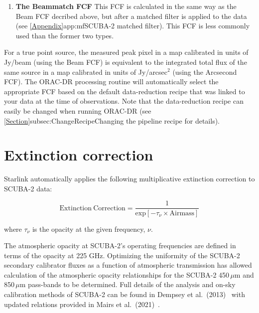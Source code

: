 \begin{enumerate}
\begin{enumerate}
   \vspace{3mm}

  \item\textbf{The Beammatch FCF}
    This FCF is calculated in the same way as the Beam FCF decribed
    above, but after a matched filter is applied to the data (see
    \cref{Appendix}{app:mf}{SCUBA-2 matched filter}).
    This FCF is less commonly used than the former two types.

  \end{enumerate}

\end{enumerate}

For a true point source, the measured peak pixel in a map calibrated in units of Jy/beam 
(using the Beam FCF) is equivalent to the integrated total flux of the same source in a map 
calibrated in units of Jy/arcsec$^{2}$ (using the Arcsecond FCF). The ORAC-DR processing
routine will automatically select the appropriate FCF based on the default data-reduction recipe
that was linked to your data at the time of observations. Note that the data-reduction recipe can 
easily be changed when running ORAC-DR (see
\cref{Section}{subsec:ChangeRecipe}{Changing the pipeline recipe} for details).

\section{Extinction correction}

Starlink automatically applies the following multiplicative extinction correction to SCUBA-2 data:

\begin{equation}
\label{eq:extcor}
\mathrm{Extinction\:Correction} = \frac{1}{\mathrm{exp}[-\tau_{\nu}\times\mathrm{Airmass}]}
\end{equation}

where $\tau_{\nu}$ is the opacity at the given frequency, $\nu$.

The atmospheric opacity at SCUBA-2’s operating frequencies are defined in 
terms of the opacity at 225 GHz. Optimizing the uniformity of the SCUBA-2 secondary 
calibrator fluxes as a function of atmospheric transmission has allowed calculation
of the atmospheric opacity relationships for the SCUBA-2 450\,$\mu$m and
850\,$\mu$m pass-bands to be determined. Full details of the analysis
and on-sky calibration methods of SCUBA-2 can be found in Dempsey et
al.\ (2013)~\cite{dempsey12}\cite{dempsey-spie} with
updated relations provided in Mairs et al.\ (2021)~\cite{mairs21}.

